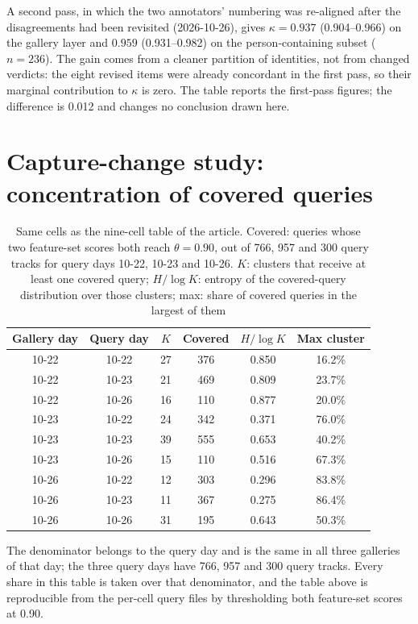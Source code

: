 \documentclass[10pt,a4paper]{article}
\begin{document}
A second pass, in which the two annotators' numbering was re-aligned after the disagreements had been revisited (2026-10-26), gives $\kappa = 0.937$ (0.904--0.966) on the gallery layer and $0.959$ (0.931--0.982) on the person-containing subset ($n = 236$). The gain comes from a cleaner partition of identities, not from changed verdicts: the eight revised items were already concordant in the first pass, so their marginal contribution to $\kappa$ is zero. The table reports the first-pass figures; the difference is 0.012 and changes no conclusion drawn here.

\section{Capture-change study: concentration of covered queries}
\begin{table}[h]\centering
\caption{Same cells as the nine-cell table of the article. Covered: queries whose two feature-set scores both reach $\theta = 0.90$, out of 766, 957 and 300 query tracks for query days 10-22, 10-23 and 10-26. $K$: clusters that receive at least one covered query; $H/\log K$: entropy of the covered-query distribution over those clusters; max: share of covered queries in the largest of them}
\begin{tabular}{@{}cccccc@{}}
\toprule
Gallery day & Query day & $K$ & Covered & $H/\log K$ & Max cluster\\
\midrule
10-22 & 10-22 & 27 & 376 & 0.850 & 16.2\%\\
10-22 & 10-23 & 21 & 469 & 0.809 & 23.7\%\\
10-22 & 10-26 & 16 & 110 & 0.877 & 20.0\%\\
10-23 & 10-22 & 24 & 342 & 0.371 & 76.0\%\\
10-23 & 10-23 & 39 & 555 & 0.653 & 40.2\%\\
10-23 & 10-26 & 15 & 110 & 0.516 & 67.3\%\\
10-26 & 10-22 & 12 & 303 & 0.296 & 83.8\%\\
10-26 & 10-23 & 11 & 367 & 0.275 & 86.4\%\\
10-26 & 10-26 & 31 & 195 & 0.643 & 50.3\%\\
\bottomrule
\end{tabular}
\end{table}

The denominator belongs to the query day and is the same in all three galleries of that day; the three query days have 766, 957 and 300 query tracks. Every share in this table is taken over that denominator, and the table above is reproducible from the per-cell query files by thresholding both feature-set scores at 0.90.
\end{document}
